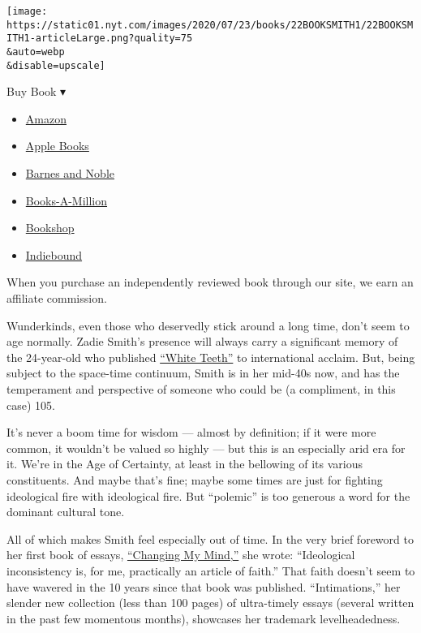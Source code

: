 \texttt{[image: https://static01.nyt.com/images/2020/07/23/books/22BOOKSMITH1/22BOOKSMITH1-articleLarge.png?quality=75\\\&auto=webp\\\&disable=upscale]}

Buy Book ▾

\begin{itemize}
\tightlist
\item
  \href{https://www.amazon.com/gp/search?index=books\&tag=NYTBSREV-20\&field-keywords=Intimations+Zadie+Smith}{Amazon}
\item
  \href{https://du-gae-books-dot-nyt-du-prd.appspot.com/buy?title=Intimations\&author=Zadie+Smith}{Apple
  Books}
\item
  \href{https://www.anrdoezrs.net/click-7990613-11819508?url=https\%3A\%2F\%2Fwww.barnesandnoble.com\%2Fw\%2F\%3Fean\%3D9780593297612}{Barnes
  and Noble}
\item
  \href{https://www.anrdoezrs.net/click-7990613-35140?url=https\%3A\%2F\%2Fwww.booksamillion.com\%2Fp\%2FIntimations\%2FZadie\%2BSmith\%2F9780593297612}{Books-A-Million}
\item
  \href{https://bookshop.org/a/3546/9780593297612}{Bookshop}
\item
  \href{https://www.indiebound.org/book/9780593297612?aff=NYT}{Indiebound}
\end{itemize}

When you purchase an independently reviewed book through our site, we
earn an affiliate commission.

Wunderkinds, even those who deservedly stick around a long time, don't
seem to age normally. Zadie Smith's presence will always carry a
significant memory of the 24-year-old who published
\href{https://archive.nytimes.com/www.nytimes.com/books/00/04/30/reviews/000430.30quinnt.html}{``White
Teeth''} to international acclaim. But, being subject to the space-time
continuum, Smith is in her mid-40s now, and has the temperament and
perspective of someone who could be (a compliment, in this case) 105.

It's never a boom time for wisdom --- almost by definition; if it were
more common, it wouldn't be valued so highly --- but this is an
especially arid era for it. We're in the Age of Certainty, at least in
the bellowing of its various constituents. And maybe that's fine; maybe
some times are just for fighting ideological fire with ideological fire.
But ``polemic'' is too generous a word for the dominant cultural tone.

All of which makes Smith feel especially out of time. In the very brief
foreword to her first book of essays,
\href{https://www.nytimes.com/2010/01/17/books/review/Mishra-t.html}{``Changing
My Mind,''} she wrote: ``Ideological inconsistency is, for me,
practically an article of faith.'' That faith doesn't seem to have
wavered in the 10 years since that book was published. ``Intimations,''
her slender new collection (less than 100 pages) of ultra-timely essays
(several written in the past few momentous months), showcases her
trademark levelheadedness.

